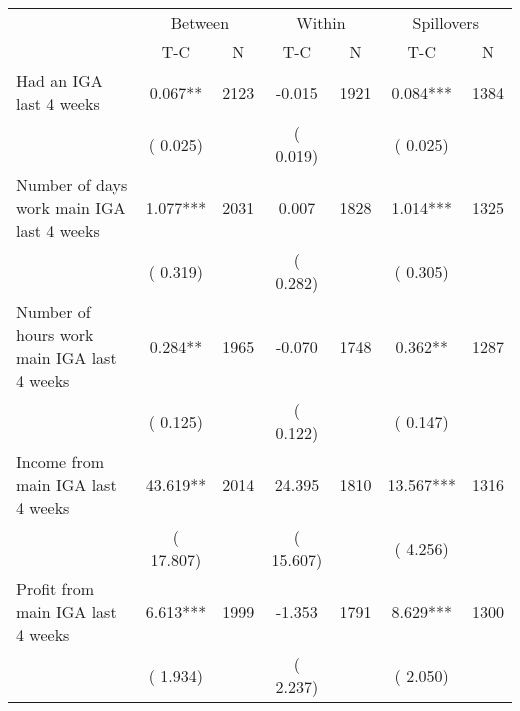 
\begin{tabular}{l*{6}{c}}\hline&\multicolumn{2}{c}{Between}&\multicolumn{2}{c}{Within}&\multicolumn{2}{c}{Spillovers} \\ \cmidrule(r){2-3}\cmidrule(l){4-5}\cmidrule(l){6-7} & {T-C} & {N} & {T-C} & {N}  & {T-C}  & {N}  \\ \midrule
Had an IGA last 4 weeks        &              0.067**      &       2123       &             -0.015      &       1921       &              0.084***      &       1384       \\
                       &       (       0.025)            &                               &       (       0.019)            &                               &       (       0.025)            &                               \\
Number of days work main IGA last 4 weeks        &              1.077***      &       2031       &              0.007      &       1828       &              1.014***      &       1325       \\
                       &       (       0.319)            &                               &       (       0.282)            &                               &       (       0.305)            &                               \\
Number of hours work main IGA last 4 weeks        &              0.284**      &       1965       &             -0.070      &       1748       &              0.362**      &       1287       \\
                       &       (       0.125)            &                               &       (       0.122)            &                               &       (       0.147)            &                               \\
Income from main IGA last 4 weeks        &             43.619**      &       2014       &             24.395      &       1810       &             13.567***      &       1316       \\
                       &       (      17.807)            &                               &       (      15.607)            &                               &       (       4.256)            &                               \\
Profit from main IGA last 4 weeks        &              6.613***      &       1999       &             -1.353      &       1791       &              8.629***      &       1300       \\
                       &       (       1.934)            &                               &       (       2.237)            &                               &       (       2.050)            &                               \\

\end{tabular}
